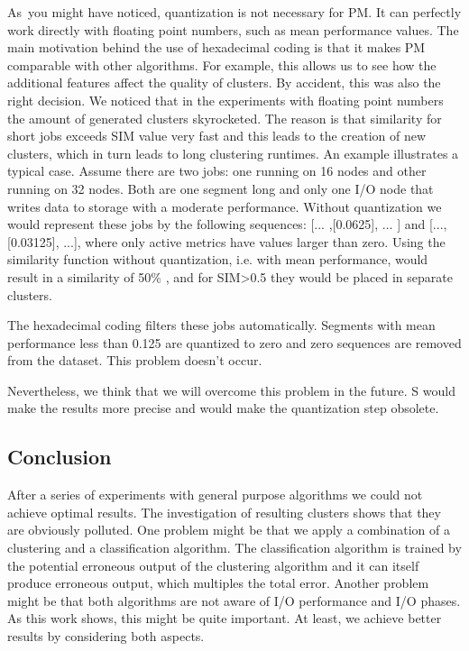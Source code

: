 \documentclass[]{llncs}
\begin{document}
{{{{As\ you might have noticed, quantization is not necessary for PM.
It can perfectly work directly with floating point numbers, such as mean performance values.
The main motivation behind the use of hexadecimal coding is that it makes PM comparable with other algorithms.
For example, this allows us to see how the additional features affect the quality of clusters.
By accident, this was also the right decision.
We noticed that in the experiments with floating point numbers the amount of generated clusters skyrocketed.
The reason is that similarity for short jobs exceeds SIM value very fast and this leads to the creation of new clusters, which in turn leads to long clustering runtimes.
An example illustrates a typical case.
Assume there are two jobs: one running on 16 nodes and other running on 32 nodes.
Both are one segment long and only one I/O node that writes data to storage with a moderate performance.
Without quantization we would represent these jobs by the following sequences:  [...
,[0.0625], $ \ldots $ ] and [..., [0.03125], ...], where only active metrics have values larger than zero.
Using the similarity function without quantization, i.e.
with mean performance, would result in a similarity of 50$\%$ , and for SIM>0.5 they would be placed in separate clusters.

The hexadecimal coding filters these jobs automatically.
Segments with mean performance less than 0.125 are quantized to zero and zero sequences are removed from the dataset.
This problem doesn’t occur.


Nevertheless, we think that we will overcome this problem in the future.
S would make the results more precise and would make the quantization step obsolete.

\subsection{Conclusion}
After a series of experiments with general purpose algorithms we could not achieve optimal results.
The investigation of resulting clusters shows that they are obviously polluted.
One problem might be that we apply a combination of a clustering and a classification algorithm.
The classification algorithm is trained by the potential erroneous output of the clustering algorithm and it can itself produce erroneous output, which multiples the total error.
Another problem might be that both algorithms are not aware of I/O performance and I/O phases.
As this work shows, this might be quite important.
At least, we achieve better results by considering both aspects.


}}}}
\end{document}
